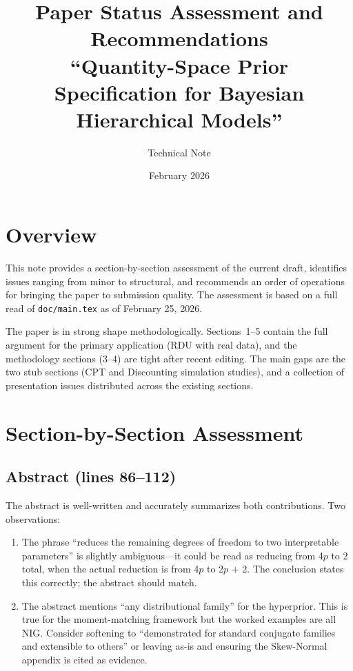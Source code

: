 \documentclass[12pt,a4paper]{article}
\title{Paper Status Assessment and Recommendations\\[6pt]
\large ``Quantity-Space Prior Specification for Bayesian Hierarchical Models''}
\author{Technical Note}
\date{February 2026}
\begin{document}
\maketitle

\section{Overview}

This note provides a section-by-section assessment of the current draft,
identifies issues ranging from minor to structural, and recommends an order of
operations for bringing the paper to submission quality. The assessment is based
on a full read of \texttt{doc/main.tex} as of February 25, 2026.

The paper is in strong shape methodologically. Sections~1--5 contain the full
argument for the primary application (RDU with real data), and the methodology
sections (3--4) are tight after recent editing. The main gaps are the two stub
sections (CPT and Discounting simulation studies), and a collection of
presentation issues distributed across the existing sections.


\section{Section-by-Section Assessment}

\subsection{Abstract (lines 86--112)}

The abstract is well-written and accurately summarizes both contributions. Two
observations:

\begin{enumerate}[label=(\alph*)]
  \item The phrase ``reduces the remaining degrees of freedom to two
    interpretable parameters'' is slightly ambiguous---it could be read as
    reducing from 4$p$ to 2 total, when the actual reduction is from 4$p$ to
    2$p$ + 2. The conclusion states this correctly; the abstract should match.
  \item The abstract mentions ``any distributional family'' for the hyperprior.
    This is true for the moment-matching framework but the worked examples are
    all NIG. Consider softening to ``demonstrated for standard conjugate
    families and extensible to others'' or leaving as-is and ensuring the
    Skew-Normal appendix is cited as evidence.
\end{enumerate}
\end{document}
